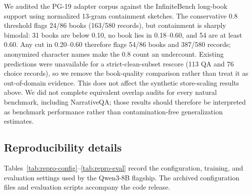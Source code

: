 
\FloatBarrier

We audited the PG-19 adapter corpus against the InfiniteBench long-book support
using normalized 13-gram containment sketches. The conservative 0.8 threshold
flags 24/86 books (163/580 records), but containment is sharply bimodal: 31 books
are below 0.10, no book lies in 0.18--0.60, and 54 are at least 0.60. Any cut in
0.20--0.60 therefore flags 54/86 books and 387/580 records; anonymized character
names make the 0.8 count an undercount. Existing predictions were unavailable
for a strict-clean-subset rescore (113 QA and 76 choice records), so we remove
the book-quality comparison rather than treat it as out-of-domain evidence.
This does not affect the synthetic store-scaling results above.
We did not complete equivalent overlap audits for every natural benchmark,
including NarrativeQA; those results should therefore be interpreted as
benchmark performance rather than contamination-free generalization estimates.

\subsection{Reproducibility details}
\label{app:reproducibility}
Tables~\ref{tab:repro-config}--\ref{tab:repro-eval} record the configuration,
training, and evaluation settings used by the Qwen3-8B flagship. The archived
configuration files and evaluation scripts accompany the code release.

